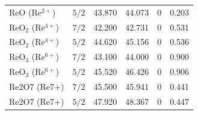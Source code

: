 \documentclass[12pt]{article}
\begin{document}
\begin{table}[H]
\begin{threeparttable}
\begin{tabular}{llrrrr}
$\mathrm{ReO}$ ($\mathrm{Re^{2+}}$) & $5/2$ & 43.870 & 44.073 & 0 & 0.203 \\
$\mathrm{ReO_2}$ ($\mathrm{Re^{4+}}$) & $7/2$ & 42.200 & 42.731 & 0 & 0.531 \\
$\mathrm{ReO_2}$ ($\mathrm{Re^{4+}}$) & $5/2$ & 44.620 & 45.156 & 0 & 0.536 \\
$\mathrm{ReO_3}$ ($\mathrm{Re^{6+}}$) & $7/2$ & 43.100 & 44.000 & 0 & 0.900 \\
$\mathrm{ReO_3}$ ($\mathrm{Re^{6+}}$) & $5/2$ & 45.520 & 46.426 & 0 & 0.906 \\
Re2O7 (Re7+) & $7/2$ & 45.500 & 45.941 & 0 & 0.441 \\
Re2O7 (Re7+) & $5/2$ & 47.920 & 48.367 & 0 & 0.447 \\
\bottomrule
\end{tabular}
\end{threeparttable}
\end{table}
\end{document}
